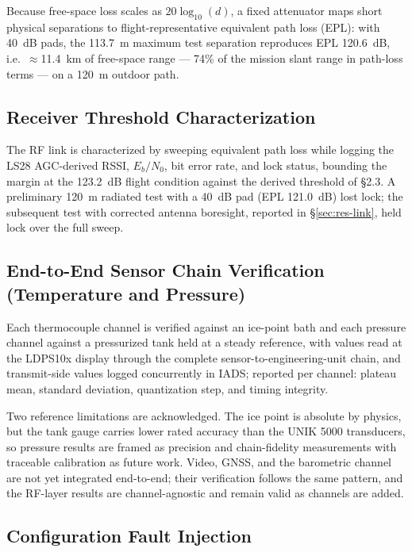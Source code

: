 \documentclass[12pt,letterpaper]{article}
\begin{document}
Because free-space loss scales as $20\log_{10}(d)$, a fixed attenuator
maps short physical separations to flight-representative equivalent path
loss (EPL): with 40~dB pads, the 113.7~m maximum test separation
reproduces EPL 120.6~dB, i.e.\ ${\approx}$11.4~km of free-space range
--- 74\% of the mission slant range in path-loss terms --- on a 120~m
outdoor path.

\subsection{Receiver Threshold Characterization}\label{sec:threshold}

The RF link is characterized by sweeping equivalent path loss while
logging the LS28 AGC-derived RSSI, $E_b/N_0$, bit error rate, and lock
status, bounding the margin at the 123.2~dB flight condition against the
derived threshold of \S2.3. A preliminary 120~m radiated test with a 40~dB
pad (EPL 121.0~dB) lost lock; the subsequent test with corrected antenna
boresight, reported in \S\ref{sec:res-link}, held lock over the full
sweep.

\subsection{End-to-End Sensor Chain Verification (Temperature and Pressure)}\label{sec:endtoend}

Each thermocouple channel is verified against an ice-point bath and each
pressure channel against a pressurized tank held at a steady reference,
with values read at the LDPS10x display through the complete
sensor-to-engineering-unit chain, and transmit-side values logged
concurrently in IADS; reported per channel: plateau mean, standard
deviation, quantization step, and timing integrity.

Two reference limitations are acknowledged. The ice point is absolute by
physics, but the tank gauge carries lower rated accuracy than the UNIK
5000 transducers, so pressure results are framed as precision and
chain-fidelity measurements with traceable calibration as future work.
Video, GNSS, and the barometric channel are not yet integrated end-to-end;
their verification follows the same pattern, and the RF-layer results are
channel-agnostic and remain valid as channels are added.

\subsection{Configuration Fault Injection}\label{sec:fault}
\end{document}
